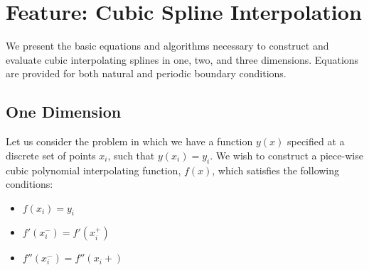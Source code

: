 %




\newpage
\section{Feature: Cubic Spline Interpolation}

\newenvironment{DMatrix}{\begin{array}|{*{20}{c}}|}{\end{array}}
\newenvironment{MyMatrix}{\begin{array}({*{20}{c}})}{\end{array}}
\newenvironment{LMatrix}{\begin{array}({*{20}{l}})}{\end{array}}

We present the basic equations and algorithms necessary to
construct and evaluate cubic interpolating splines in one, two, and
three dimensions.  Equations are provided for both natural and
periodic boundary conditions.

\subsection{One Dimension}
Let us consider the problem in which we have a function $y(x)$
specified at a discrete set of points $x_i$, such that $y(x_i) = y_i$.
We wish to construct a piece-wise cubic polynomial interpolating
function, $f(x)$, which satisfies the following conditions:
\begin{itemize}
\item $f(x_i) = y_i$
\item $f'(x_i^-) = f'(x_i^+)$
\item $f''(x_i^-) = f''(x_i+)$
\end{itemize}

